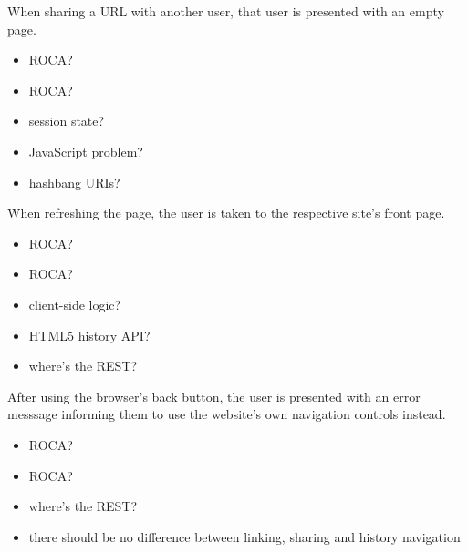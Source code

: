 \documentclass{beamer}
\newcommand{\rocafail}{\ding{55}}
\begin{document}
\begin{frame}
  When sharing a URL with another user, that user is presented with an empty page.

  \vspace{0.3cm}
  \begin{itemize}
    \item<1|only@1>[\Large $\square$] \Large ROCA?
    \item<2|only@2>[\Large \rocafail] \Large ROCA?
    \item<2> session state?
    \item<2> JavaScript problem?
    \item<2> hashbang URIs?
  \end{itemize}

\end{frame}

\begin{frame}
  When refreshing the page, the user is taken to the respective site's front page.

  \vspace{0.3cm}
  \begin{itemize}
    \item<1|only@1>[\Large $\square$] \Large ROCA?
    \item<2|only@2>[\Large \rocafail] \Large ROCA?
    \item<2> client-side logic?
    \item<2> HTML5 history API?
    \item<2> where's the REST?
  \end{itemize}

\end{frame}

\begin{frame}
  After using the browser's back button, the user is presented with an error
  messsage informing them to use the website's own navigation controls instead.

  \vspace{0.3cm}
  \begin{itemize}
    \item<1|only@1>[\Large $\square$] \Large ROCA?
    \item<2|only@2>[\Large \rocafail] \Large ROCA?
    \item<2> where's the REST?
    \item<2> there should be no difference between linking, sharing and history navigation
  \end{itemize}

\end{frame}
\end{document}
